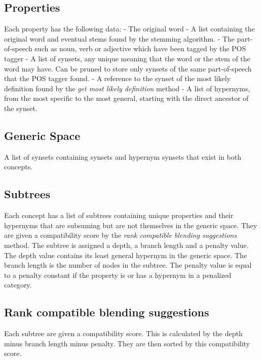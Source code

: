 \subsection{Properties}
Each property has the following data:
- The original word
- A list containing the original word and eventual stems found by the stemming algorithm.
- The part-of-speech such as noun, verb or adjective which have been tagged by the POS tagger
- A list of synsets, any unique meaning that the word or the stem of the word may have. Can be pruned to store only synsets of the same part-of-speech that the POS tagger found.
- A reference to the synset of the most likely definition found by the \emph{get most likely definition} method
- A list of hypernyms, from the most specific to the most general, starting with the direct ancestor of the synset.

\subsection{Generic Space}
A list of synsets containing synsets and hypernym synsets that exist in both concepts.

\subsection{Subtrees}
Each concept has a list of subtrees containing unique properties and their hypernyms that are subsuming but are not themselves in the generic space. They are given a compatibility score by the \emph{rank compatible blending suggestions} method. The subtree is assigned a depth, a branch length and a penalty value. The depth value contains its least general hypernym in the generic space.
The branch length is the number of nodes in the subtree. The penalty value is equal to a penalty constant if the property is or has a hypernym in a penalized category.

\subsection{Rank compatible blending suggestions}
Each subtree are given a compatibility score. This is calculated by the depth minus branch length minus penalty. They are then sorted by this compatibility score.

